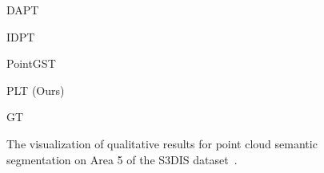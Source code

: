 \begin{figure}[htbp]
    \vspace{0.5em}
    \begin{minipage}{0.02\textwidth} %
        \color{white}{12}
    \end{minipage}
    \hfill
    \begin{minipage}{0.185\textwidth} %
        \centering
        DAPT
    \end{minipage}
    \hfill
    \begin{minipage}{0.185\textwidth} %
        \centering
        IDPT
    \end{minipage}
    \hfill
    \begin{minipage}{0.185\textwidth} %
        \centering
        PointGST
    \end{minipage}
    \hfill
    \begin{minipage}{0.185\textwidth} %
        \centering
        PLT (Ours)
    \end{minipage}
    \hfill
    \begin{minipage}{0.185\textwidth} %
        \centering
        GT
    \end{minipage}
    \hfill
    \caption{The visualization of qualitative results for point cloud semantic segmentation on Area 5 of the S3DIS dataset~\cite{armeni20163d}. %
    }
    \label{fig:s3dis_1}

\end{figure}
